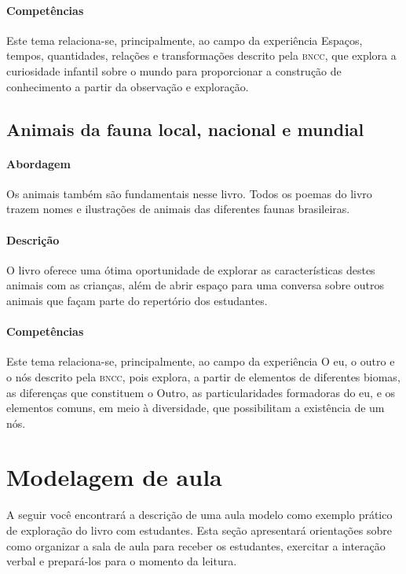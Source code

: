 \documentclass[11pt]{extarticle}
\begin{document}
\paragraph{Competências} Este tema relaciona-se, principalmente, ao 
campo da experiência Espaços, tempos, quantidades, relações e transformações 
descrito pela \textsc{bncc}, que explora a curiosidade infantil sobre o mundo 
para proporcionar a construção de conhecimento a partir da observação e exploração.

\subsection{Animais da fauna local, nacional e mundial}

\paragraph{Abordagem} Os animais também são fundamentais nesse livro. 
Todos os poemas do livro trazem nomes e ilustrações de animais das diferentes faunas brasileiras.

\paragraph{Descrição} O livro oferece uma ótima oportunidade de explorar 
as características destes animais com as crianças, além de abrir espaço para uma 
conversa sobre outros animais que façam parte do repertório dos estudantes. 

\paragraph{Competências} Este tema relaciona-se, principalmente, ao 
campo da experiência O eu, o outro e o nós 
descrito pela \textsc{bncc}, pois explora, a partir de elementos de diferentes biomas, as diferenças que constituem o Outro, as particularidades formadoras do eu, e os elementos comuns, em meio à diversidade, que possibilitam a existência de um nós.



\section{Modelagem de aula}
A seguir você encontrará a descrição de uma aula modelo como exemplo 
prático de exploração do livro com estudantes. Esta seção apresentará 
orientações sobre como organizar a sala de aula para receber os 
estudantes, exercitar a interação verbal e prepará-los para o 
momento da leitura.
\end{document}
